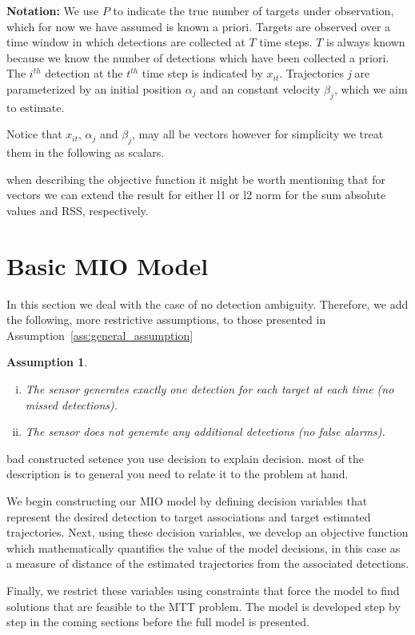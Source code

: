 \documentclass[journal]{IEEEtran}
\newtheorem{assumption}{Assumption}
\begin{document}
{\bf Notation:}
We use $P$ to indicate the true number of targets under observation, which for now we have assumed is known a priori. Targets are observed over a time window in which detections are collected at $T$ time steps. $T$ is always known because we know the number of detections which have been collected a priori. The $i^{th}$ detection at the $t^{th}$ time step is indicated by $x_{it}$. Trajectories \textit{j} are parameterized by an initial position $\alpha_{j}$ and an constant velocity $\beta_{j}$, which we aim to estimate. {\color{red} Notice that $x_{it}$, $\alpha_{j}$ and $\beta_{j}$, may all be vectors however for simplicity we treat them in the following as scalars.

when describing the objective function it might be worth mentioning that for vectors we can extend the result for either l1 or l2 norm for the sum absolute values and RSS, respectively.}

\section{{\color{red} Basic MIO Model}}

In this section we deal with the case of no detection ambiguity. Therefore, we add the following, more restrictive assumptions, to those presented in Assumption~\ref{ass:general_assumption}
\begin{assumption}\label{ass:basic_assumptions}
\begin{enumerate}[(i)]
\item The sensor generates exactly one detection for each target at each time (no missed detections).
\item The sensor does not generate any additional detections (no false alarms).
\end{enumerate}
\end{assumption}

{\color{red} bad constructed setence you use decision to explain decision. most of the description is to general you need to relate it to the problem at hand.

We begin constructing our MIO model by defining decision variables that represent the desired detection to target associations and target estimated trajectories. Next, using these decision variables, we develop an objective function which mathematically quantifies the value of the model decisions, in this case as a measure of distance of the estimated trajectories from the associated detections.} Finally, we restrict these variables using constraints that force the model to find solutions that are feasible to the MTT problem. The model is developed step by step in the coming sections before the full model is presented. 
\end{document}
